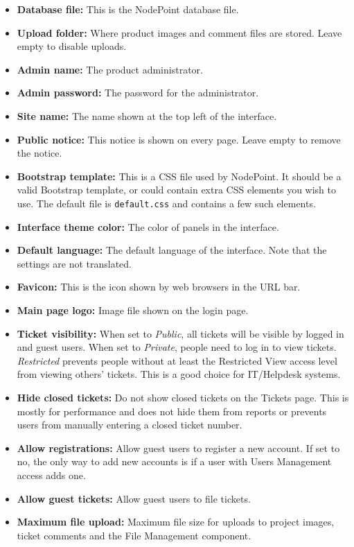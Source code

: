 \documentclass[11pt]{article}
\begin{document}
\begin{itemize}
\item \textbf{Database file:} This is the NodePoint database file.
\item \textbf{Upload folder:} Where product images and comment files are stored. Leave empty to disable uploads.
\item \textbf{Admin name:} The product administrator.
\item \textbf{Admin password:} The password for the administrator.
\item \textbf{Site name:} The name shown at the top left of the interface.
\item \textbf{Public notice:} This notice is shown on every page. Leave empty to remove the notice.
\item \textbf{Bootstrap template:} This is a CSS file used by NodePoint. It should be a valid Bootstrap template, or could contain extra CSS elements you wish to use. The default file is \texttt{default.css} and contains a few such elements.
\item \textbf{Interface theme color:} The color of panels in the interface.
\item \textbf{Default language:} The default language of the interface. Note that the settings are not translated.
\item \textbf{Favicon:} This is the icon shown by web browsers in the URL bar.
\item \textbf{Main page logo:} Image file shown on the login page.
\item \textbf{Ticket visibility:} When set to \textit{Public}, all tickets will be visible by logged in and guest users. When set to \textit{Private}, people need to log in to view tickets. \textit{Restricted} prevents people without at least the Restricted View access level from viewing others' tickets. This is a good choice for IT/Helpdesk systems.
\item \textbf{Hide closed tickets:}  Do not show closed tickets on the Tickets page. This is mostly for performance and does not hide them from reports or prevents users from manually entering a closed ticket number.
\item \textbf{Allow registrations:} Allow guest users to register a new account. If set to no, the only way to add new accounts is if a user with Users Management access adds one.
\item \textbf{Allow guest tickets:} Allow guest users to file tickets.
\item \textbf{Maximum file upload:} Maximum file size for uploads to project images, ticket comments and the File Management component.

\end{itemize}
\end{document}
